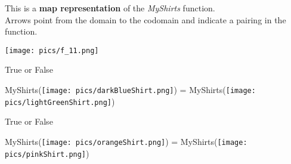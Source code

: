 \documentclass{ximera}
\author{Lee Wayand}
\begin{document}
\begin{exercise}





This is a \textbf{map representation} of the \textit{MyShirts} function. \\

Arrows point from the domain to the codomain and indicate a pairing in the function.

\begin{image}
\texttt{[image: pics/f\_11.png]}
\end{image}















\begin{question}

True or False

\begin{center}
MyShirts(\texttt{[image: pics/darkBlueShirt.png]}) = MyShirts(\texttt{[image: pics/lightGreenShirt.png]})
\end{center}






\begin{multipleChoice}
\end{multipleChoice}

\end{question}







\begin{question}

True or False

\begin{center}
MyShirts(\texttt{[image: pics/orangeShirt.png]}) = MyShirts(\texttt{[image: pics/pinkShirt.png]})
\end{center}






\begin{multipleChoice}
\end{multipleChoice}

\end{question}

















\end{exercise}
\end{document}
